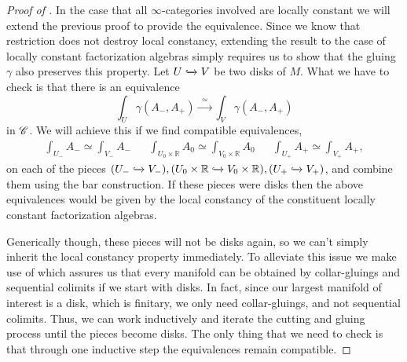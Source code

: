 \documentclass[../text]{subfiles}
\begin{document}
\begin{proof}[Proof of ]
    In the case that all $\infty$-categories involved are locally constant we will extend the previous proof to provide the equivalence. Since we know that restriction does not destroy local constancy, extending the result to the case of locally constant factorization algebras simply requires us to show that the gluing $\gamma$ also preserves this property. Let $U \xhookrightarrow{} V$ be two disks of $M$. What we have to check is that there is an equivalence
    \begin{equation}
        \int_U \gamma(A_-, A_+) \xrightarrow{\ \ \simeq \ \ } \int_V \gamma(A_-, A_+)
    \end{equation}
    in $\mathscr{C}$. We will achieve this if we find compatible equivalences,
    \begin{align}
        &\int_{U_-} A_- \simeq \int_{V_-} A_-& &\int_{U_0 \times \mathbb{R}} A_0 \simeq \int_{V_0 \times \mathbb{R}} A_0& &\int_{U_+} A_+ \simeq \int_{V_+} A_+,&
    \end{align}
    on each of the pieces $(U_- \xhookrightarrow{} V_-), (U_0 \times \mathbb{R} \xhookrightarrow{} V_0 \times \mathbb{R}), (U_+ \xhookrightarrow{} V_+)$, and combine them using the bar construction. If these pieces were disks then the above equivalences would be given by the local constancy of the constituent locally constant factorization algebras.
    
    Generically though, these pieces will not be disks again, so we can't simply inherit the local constancy property immediately. To alleviate this issue we make use of  which assures us that every manifold can be obtained by collar-gluings and sequential colimits if we start with disks. In fact, since our largest manifold of interest is a disk, which is finitary, we only need collar-gluings, and not sequential colimits. Thus, we can work inductively and iterate the cutting and gluing process until the pieces become disks. The only thing that we need to check is that through one inductive step the equivalences remain compatible.
    

\end{proof}
\end{document}
